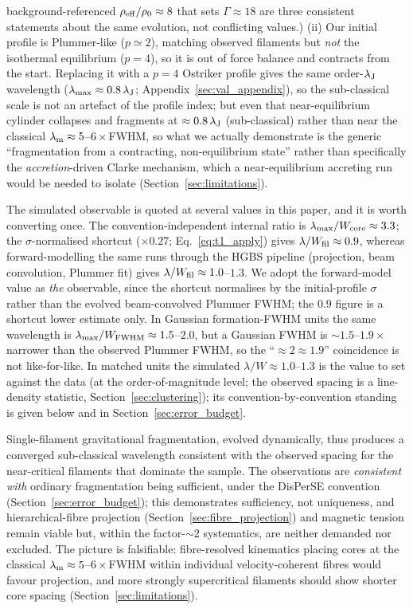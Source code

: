 \documentclass[usenatbib,twoside,twocolumn]{mnras}
\begin{document}
background-referenced $\rho_{\rm eff}/\rho_0\approx8$ that sets $\Gamma\approx18$ are three consistent statements about the same evolution, not conflicting values.) (ii) Our initial profile is Plummer-like ($p\simeq2$), matching observed filaments but \emph{not} the isothermal equilibrium ($p=4$), so it is out of force balance and contracts from the start. Replacing it with a $p=4$ Ostriker profile gives the same order-$\lambda_{\rm J}$ wavelength ($\lambda_{\rm max}\approx0.8\,\lambda_{\rm J}$; Appendix~\ref{sec:val_appendix}), so the sub-classical scale is not an artefact of the profile index; but even that near-equilibrium cylinder collapses and fragments at $\approx0.8\,\lambda_{\rm J}$ (sub-classical) rather than near the classical $\lambda_{\rm m}\approx5$--$6\times$FWHM, so what we actually demonstrate is the generic ``fragmentation from a contracting, non-equilibrium state'' rather than specifically the \emph{accretion}-driven Clarke mechanism, which a near-equilibrium accreting run would be needed to isolate (Section~\ref{sec:limitations}).

The simulated observable is quoted at several values in this paper, and it is worth converting once. The convention-independent internal ratio is $\lambda_{\rm max}/W_{\rm core}\approx3.3$; the $\sigma$-normalised shortcut ($\times0.27$; Eq.~\ref{eq:t1_apply}) gives $\lambda/W_{\rm fil}\approx0.9$, whereas forward-modelling the same runs through the HGBS pipeline (projection, beam convolution, Plummer fit) gives $\lambda/W_{\rm fil}\approx1.0$--$1.3$. We adopt the forward-model value as \emph{the} observable, since the shortcut normalises by the initial-profile $\sigma$ rather than the evolved beam-convolved Plummer FWHM; the $0.9$ figure is a shortcut lower estimate only. In Gaussian formation-FWHM units the same wavelength is $\lambda_{\rm max}/W_{\rm FWHM}\approx1.5$--$2.0$, but a Gaussian FWHM is $\sim1.5$--$1.9\times$ narrower than the observed Plummer FWHM, so the ``$\approx2\approx1.9$'' coincidence is not like-for-like. In matched units the simulated $\lambda/W\approx1.0$--$1.3$ is the value to set against the data (at the order-of-magnitude level; the observed spacing is a line-density statistic, Section~\ref{sec:clustering}); its convention-by-convention standing is given below and in Section~\ref{sec:error_budget}.

Single-filament gravitational fragmentation, evolved dynamically, thus produces a converged sub-classical wavelength consistent with the observed spacing for the near-critical filaments that dominate the sample. The observations are \emph{consistent with} ordinary fragmentation being sufficient, under the DisPerSE convention (Section~\ref{sec:error_budget}); this demonstrates sufficiency, not uniqueness, and hierarchical-fibre projection (Section~\ref{sec:fibre_projection}) and magnetic tension remain viable but, within the factor-$\sim$2 systematics, are neither demanded nor excluded. The picture is falsifiable: fibre-resolved kinematics placing cores at the classical $\lambda_{\rm m}\approx5$--$6\times$FWHM within individual velocity-coherent fibres would favour projection, and more strongly supercritical filaments should show shorter core spacing (Section~\ref{sec:limitations}).
\end{document}
